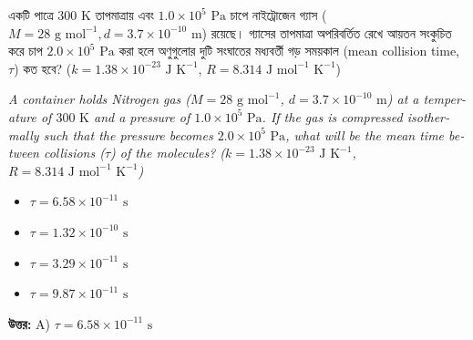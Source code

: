 \documentclass[12pt, a4paper]{article}
\begin{document}
\begin{tcolorbox}[questionbox={প্রশ্ন (Question) 24}]
    \noindent
    একটি পাত্রে $300\text{ K}$ তাপমাত্রায় এবং $1.0 \times 10^5\text{ Pa}$ চাপে নাইট্রোজেন গ্যাস ($M = 28\text{ g mol}^{-1}, d = 3.7 \times 10^{-10}\text{ m}$) রয়েছে। গ্যাসের তাপমাত্রা অপরিবর্তিত রেখে আয়তন সংকুচিত করে চাপ $2.0 \times 10^5\text{ Pa}$ করা হলে অণুগুলোর দুটি সংঘাতের মধ্যবর্তী গড় সময়কাল (mean collision time, $\tau$) কত হবে? ($k = 1.38 \times 10^{-23}\text{ J K}^{-1}$, $R = 8.314\text{ J mol}^{-1}\text{ K}^{-1}$)
    
    \vspace{0.8em}
    \begin{english}
    \noindent\textit{\color{darkgray}
    A container holds Nitrogen gas ($M = 28\text{ g mol}^{-1}$, $d = 3.7 \times 10^{-10}\text{ m}$) at a temperature of $300\text{ K}$ and a pressure of $1.0 \times 10^5\text{ Pa}$. If the gas is compressed isothermally such that the pressure becomes $2.0 \times 10^5\text{ Pa}$, what will be the mean time between collisions ($\tau$) of the molecules? ($k = 1.38 \times 10^{-23}\text{ J K}^{-1}$, $R = 8.314\text{ J mol}^{-1}\text{ K}^{-1}$)
    }
    \end{english}
\end{tcolorbox}
\begin{itemize}[label={}, leftmargin=1cm, itemsep=0.5em]
    \item[\textbf{A)}] $\tau = 6.58 \times 10^{-11}\text{ s}$
    \item[\textbf{B)}] $\tau = 1.32 \times 10^{-10}\text{ s}$
    \item[\textbf{C)}] $\tau = 3.29 \times 10^{-11}\text{ s}$
    \item[\textbf{D)}] $\tau = 9.87 \times 10^{-11}\text{ s}$
\end{itemize}

\vspace{0.5em}
\begin{tcolorbox}[answerbox]
    \textbf{\color{success} উত্তর:} A) $\tau = 6.58 \times 10^{-11}\text{ s}$
\end{tcolorbox}
\vspace{1em}
\end{document}
